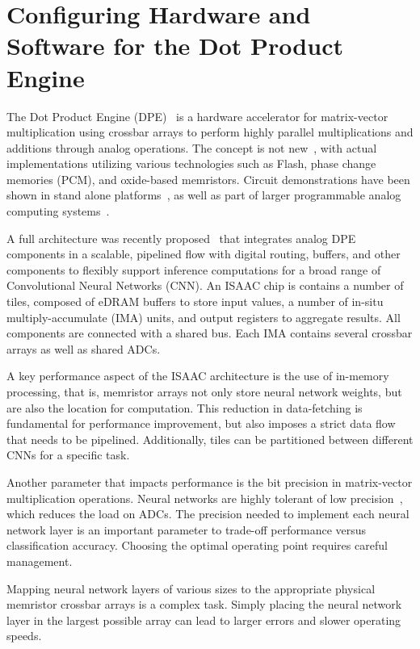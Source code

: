 \section{Configuring Hardware and Software for the Dot Product Engine}
\label{sec:configDPE}

The Dot Product Engine (DPE)~\cite{hu2016dot} is a hardware accelerator for
matrix-vector multiplication using crossbar arrays to perform highly parallel
multiplications and additions through analog operations.  The concept is not
new~\cite{steinbuch1961lernmatrix,likharev2011crossnets}, with actual
implementations utilizing various technologies such as Flash, phase change
memories (PCM), and oxide-based memristors.  Circuit demonstrations have been
shown in stand alone platforms~\cite{prezioso2015training}, as well as part of
larger programmable analog computing systems~\cite{george2016programmable}.

A full architecture was recently proposed~\cite{shafiee2016isaac} that
integrates analog DPE components in a scalable, pipelined flow with digital
routing, buffers, and other components to flexibly support inference
computations for a broad range of Convolutional Neural Networks (CNN).  An
ISAAC chip is contains a number of tiles, composed of eDRAM buffers to store
input values, a number of in-situ multiply-accumulate (IMA) units, and output
registers to aggregate results.  All components are connected with a shared
bus.  Each IMA contains several crossbar arrays as well as shared ADCs.

A key performance aspect of the ISAAC architecture is the use of in-memory
processing, that is, memristor arrays not only store neural network weights,
but are also the location for computation. This reduction in data-fetching is
fundamental for performance improvement, but also imposes a strict data flow
that needs to be pipelined. Additionally, tiles can be partitioned between
different CNNs for a specific task.

Another parameter that impacts performance is the bit precision in matrix-vector
multiplication operations. Neural networks are highly tolerant of low
precision~\cite{courbariaux2014low, rastegari2016xnor, zhou2016dorefa}, which
reduces the load on ADCs. The precision needed to implement each neural network
layer is an important parameter to trade-off performance versus classification
accuracy.  Choosing the optimal operating point requires careful management.

Mapping neural network layers of various sizes to the appropriate physical
memristor crossbar arrays is a complex task.   Simply placing the neural
network layer in the largest possible array can lead to larger errors and
slower operating speeds.

